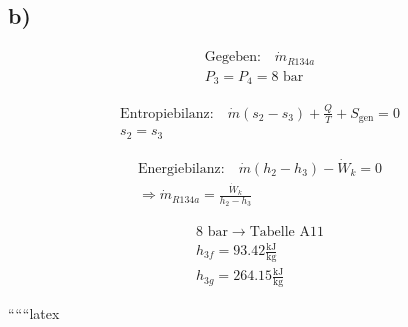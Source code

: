 

\subsection*{b)}

\begin{align*}
    \text{Gegeben:} \quad \dot{m}_{R134a} \\
    P_3 = P_4 = 8 \text{ bar}
\end{align*}


\begin{align*}
    \text{Entropiebilanz:} \quad \dot{m} (s_2 - s_3) + \frac{Q}{T} + S_{\text{gen}} = 0 \\
    s_2 = s_3
\end{align*}

\begin{align*}
    \text{Energiebilanz:} \quad \dot{m} (h_2 - h_3) - \dot{W}_k = 0 \\
    \Rightarrow \dot{m}_{R134a} = \frac{\dot{W}_k}{h_2 - h_3}
\end{align*}


\begin{align*}
    8 \text{ bar} \rightarrow \text{Tabelle A11} \\
    h_{3f} = 93.42 \frac{\text{kJ}}{\text{kg}} \\
    h_{3g} = 264.15 \frac{\text{kJ}}{\text{kg}}
\end{align*}

``````latex